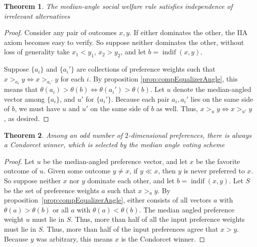 \documentclass[12pt]{article}
\newtheorem{theorem}{Theorem}
\DeclareMathOperator*{\indif}{indif}
\newcommand{\1}[1]{\mathds{1}[{#1}]}
\begin{document}
  \begin{theorem}\label{thrm:2DIIA}
    The median-angle social welfare rule satisfies independence of irrelevant
    alternatives
  \end{theorem}
  \begin{proof}
    Consider any pair of outcomes $x,y$. If either dominates the other, the
    IIA axiom becomes easy to verify.
    So suppose neither dominates the other, without loss of generality take
    $x_1 < y_1$, $x_2 > y_2$, and let $b = \indif(x,y)$.

    Suppose $\{a_i\}$ and $\{a_i'\}$ are collections of preference weights such
    that $x>_{a_i} y \iff x>_{a_i'} y$ for each $i$.
    By proposition \ref{prop:compEqualizerAngle},
    this means that $\theta(a_i) > \theta(b) \iff \theta(a_i') > \theta(b)$.
    Let $u$ denote the median-angled vector among $\{a_i\}$,
    and $u'$ for $\{a_i'\}$.
    Because each pair $a_i, a_i'$ lies on the same side of $b$,
    we must have $u$ and $u'$ on the same side of $b$ as well.
    Thus, $x >_u y \iff x >_{u'} y$, as desired.
  \end{proof}

  \begin{theorem}\label{thrm:2DCondorcet}
    Among an odd number of $2$-dimensional preferences,
    there is always a Condorcet winner, which is selected
    by the median angle voting scheme
  \end{theorem}
  \begin{proof}
    Let $u$ be the median-angled preference vector, and let
    $x$ be the favorite outcome of $u$.
    Given some outcome $y\ne x$, if $y \ll x$, then
    $y$ is never preferred to $x$.
    So suppose neither $x$ nor $y$ dominate each other, and let
    $b = \indif(x,y)$.
    Let $S$ be the set of preference weights $a$ such that $x>_a y$.
    By proposition~\ref{prop:compEqualizerAngle}, either consists of all vectors
    $a$ with $\theta(a) > \theta(b)$ or all $a$ with $\theta(a) < \theta(b)$.
    The median angled preference weight $u$ must lie in $S$.
    Thus, more than half of all the input preference weights must lie in $S$.
    Thus, more than half of the input preferences agree that $x > y$.
    Because $y$ was arbitrary, this means $x$ is the Condorcet winner.
  \end{proof}
\end{document}
